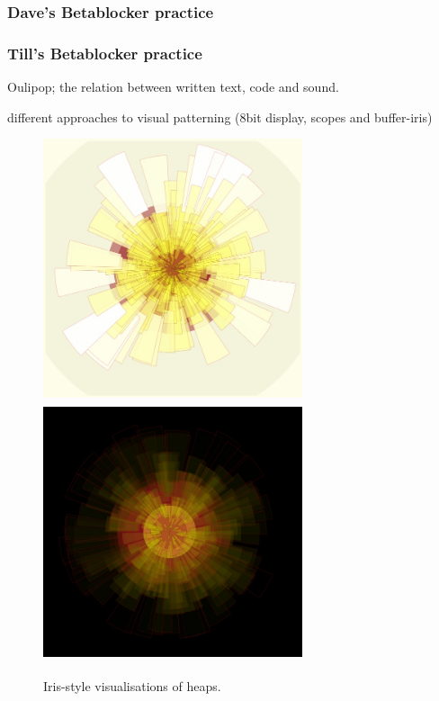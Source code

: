 \documentclass[letterpaper, 12pt]{article}
\begin{document}
\subsubsection{Dave's Betablocker practice}
\label{sub:daves_performance_style}


\subsubsection{Till's Betablocker practice}
\label{sub:tills_performance_style}

Oulipop; the relation between written text, code and sound.


different approaches to visual patterning (8bit display, scopes and buffer-iris)

\begin{figure}
	\centering
		\includegraphics[width=3in, height=3in]{2013-heapIris-white}
		\includegraphics[width=3in, height=3in]{2013-heapIris-black}
	\caption{Iris-style visualisations of heaps.}
	\label{fig:fig_2013-heapIris-white}
\end{figure}
\end{document}
